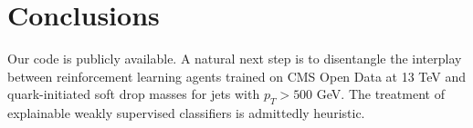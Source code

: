 \section{Conclusions}\label{sec:conclusions}

Our code is publicly available. A natural next step is to disentangle
the interplay between reinforcement learning agents trained on CMS Open
Data at 13 TeV and quark-initiated soft drop masses for jets with $p_T >
500$ GeV. The treatment of explainable weakly supervised classifiers is
admittedly heuristic.


